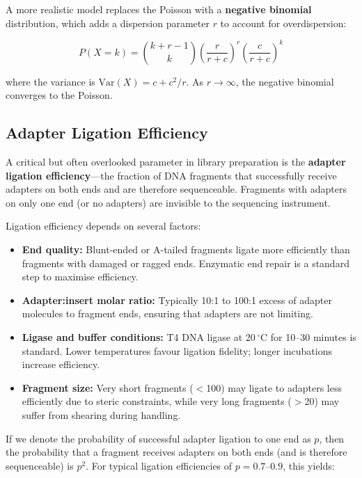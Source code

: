 A more realistic model replaces the Poisson with a \textbf{negative binomial} distribution, which adds a dispersion parameter $r$ to account for overdispersion:

\begin{equation}
P(X = k) = \binom{k + r - 1}{k} \left(\frac{r}{r + c}\right)^r \left(\frac{c}{r + c}\right)^k
\label{eq:seqprinciples:nb-coverage}
\end{equation}

where the variance is $\text{Var}(X) = c + c^2/r$. As $r \to \infty$, the negative binomial converges to the Poisson.


\subsection{Adapter Ligation Efficiency}
\label{subsec:seqprinciples:ligation-efficiency}

A critical but often overlooked parameter in library preparation is the \textbf{adapter ligation efficiency}---the fraction of DNA fragments that successfully receive adapters on both ends and are therefore sequenceable. Fragments with adapters on only one end (or no adapters) are invisible to the sequencing instrument.

Ligation efficiency depends on several factors:

\begin{itemize}[itemsep=2pt]
  \item \textbf{End quality:} Blunt-ended or A-tailed fragments ligate more efficiently than fragments with damaged or ragged ends. Enzymatic end repair is a standard step to maximise efficiency.
  \item \textbf{Adapter:insert molar ratio:} Typically 10:1 to 100:1 excess of adapter molecules to fragment ends, ensuring that adapters are not limiting.
  \item \textbf{Ligase and buffer conditions:} T4 DNA ligase at 20$\,^\circ$C for 10--30 minutes is standard. Lower temperatures favour ligation fidelity; longer incubations increase efficiency.
  \item \textbf{Fragment size:} Very short fragments ($<$100\basepair{}) may ligate to adapters less efficiently due to steric constraints, while very long fragments ($>$20\kilobase{}) may suffer from shearing during handling.
\end{itemize}

If we denote the probability of successful adapter ligation to one end as $p$, then the probability that a fragment receives adapters on both ends (and is therefore sequenceable) is $p^2$. For typical ligation efficiencies of $p = 0.7$--$0.9$, this yields:

